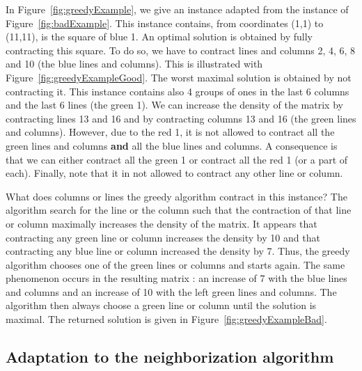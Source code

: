 In Figure~\ref{fig:greedyExample}, we give an instance adapted from the instance of Figure~\ref{fig:badExample}. This instance contains, from coordinates (1,1) to (11,11), is the square of blue 1. An optimal solution is obtained by fully contracting this square. To do so, we have to contract lines and columns 2, 4, 6, 8 and 10 (the blue lines and columns). This is illustrated with Figure~\ref{fig:greedyExampleGood}. The worst maximal solution is obtained by not contracting it. This instance contains also 4 groups of ones in the last 6 columns and the last 6 lines (the green 1). We can increase the density of the matrix by contracting lines 13 and 16 and by contracting columns 13 and 16 (the green lines and columns). However, due to the red 1, it is not allowed to contract all the green lines and columns \textbf{and} all the blue lines and columns. A consequence is that we can either contract all the green 1 or contract all the red 1 (or a part of each). Finally, note that it in not allowed to contract any other line or column.

What does columns or lines the greedy algorithm contract in this instance? The algorithm search for the line or the column such that the contraction of that line or column maximally increases the density of the matrix. It appears that contracting any green line or column increases the density by 10 and that contracting any blue line or column increased the density by 7. Thus, the greedy algorithm chooses one of the green lines or columns and starts again. The same phenomenon occurs in the resulting matrix : an increase of 7 with the blue lines and columns and an increase of 10 with the left green lines and columns. The algorithm then always choose a green line or column until the solution is maximal. The returned solution is given in Figure~\ref{fig:greedyExampleBad}.



\renewcommand{\gridsize}{0.5}




\subsection{Adaptation to the neighborization algorithm}

